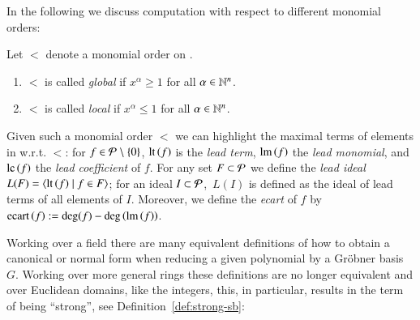 In the following we discuss computation with respect to different monomial orders:
\begin{definition}
\label{def:orders}
Let $<$ denote a monomial order on \epr. 
\begin{enumerate}
\item $<$ is called \emph{global} if $x^\alpha \geq 1$ for all $\alpha \in \mathbb{N}^n$.
\item $<$ is called \emph{local} if $x^\alpha \leq 1$ for all $\alpha \in \mathbb{N}^n$.
\end{enumerate}
\end{definition}
Given such a monomial order $<$ we can highlight the maximal terms of
elements in \epr w.r.t. $<$: for $f\in \mathcal{P}\ \backslash\ \{0\}$,
$\operatorname{lt}\left({f}\right)$ is the \emph{lead term}, $\operatorname{lm}\left({f}\right)$ the \emph{lead monomial}, and $\mathrm{lc}\left({f}\right)$
the \emph{lead coefficient} of $f$. For any set $F \subset \mathcal{P}$ we define
the \emph{lead ideal} $L(F) = \langle \operatorname{lt}\left({f}\right) \mid f \in F\rangle$; for an ideal
$I \subset \mathcal{P}$,\  $L(I)$ is defined as the ideal of lead terms of all elements of
$I$. Moreover, we define the \emph{ecart} of $f$ by $\mathrm{ecart}\left({f}\right) := \deg(f) -
\deg\left(\operatorname{lm}\left({f}\right)\right)$. 

Working over a field there are many equivalent definitions of how to obtain a
canonical or normal form when reducing a given polynomial by a Gr\"obner basis $G$.
Working over more general rings these definitions are no longer equivalent and
over Euclidean domains, like the integers, this, in particular, results in the term
of being ``strong'', see Definition~\ref{def:strong-sb}:

